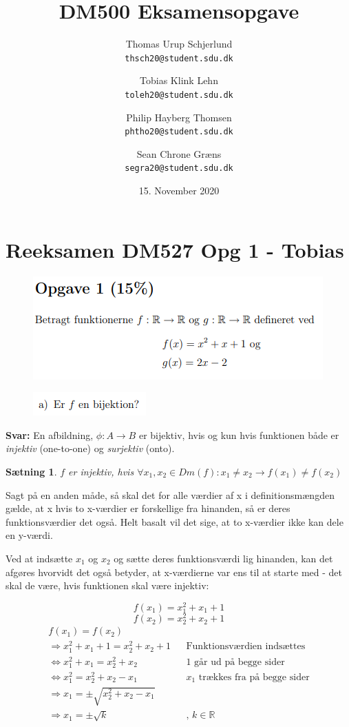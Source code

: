 \documentclass{article}
\title{DM500 Eksamensopgave}
\author{
	Thomas Urup Schjerlund\\
	\texttt{thsch20@student.sdu.dk}
	\and
	Tobias Klink Lehn\\
	\texttt{toleh20@student.sdu.dk}
	\and
	Philip Hayberg Thomsen\\
	\texttt{phtho20@student.sdu.dk}
	\and
	Sean Chrone Græns\\
	\texttt{segra20@student.sdu.dk}
}
\date{15. November 2020}
\newtheorem{theorem}{Sætning}
\begin{document}
\begin{titlepage}
\maketitle
\end{titlepage}

\section{Reeksamen DM527 Opg 1 - Tobias}
\begin{figure}[h]
\includegraphics[scale=1]{Opgave1Formulering}
\end{figure}

\begin{figure}[h]
\includegraphics[scale=1]{opga}
\end{figure}
\textbf{Svar:}
En afbildning, $\phi: A \rightarrow B$ er bijektiv, hvis og kun hvis funktionen både er \emph{injektiv} (one-to-one) og \emph{surjektiv} (onto).

\begin{theorem}
$f$ er injektiv, hvis $\forall x_1, x_2 \in Dm(f): x_1 \neq x_2 \rightarrow f(x_1) \neq f(x_2)$
\end{theorem}

Sagt på en anden måde, så skal det for alle værdier af x i definitionsmængden gælde, at x hvis to x-værdier er forskellige fra hinanden, så er deres funktionsværdier det også. Helt basalt vil det sige, at to x-værdier ikke kan dele en y-værdi.

Ved at indsætte $x_1$ og $x_2$ og sætte deres funktionsværdi lig hinanden, kan det afgøres hvorvidt det også betyder, at x-værdierne var ens til at starte med - det skal de være, hvis funktionen skal være injektiv:
\begin{center}
\[f(x_1) = x_1^2 + x_1 + 1 \] 
\[ f(x_2)=x_2^2 + x_2 + 1 \] 
\begin{align*}
f(x_1) = f(x_2) \\
\Rightarrow x^2_1 + x_1 + 1 = x^2_2 + x_2 + 1 && \text{Funktionsværdien indsættes} \\
\Leftrightarrow x^2_1 + x_1 = x^2_2 + x_2 && \text{1 går ud på begge sider} \\
\Leftrightarrow x_1^2 = x_2^2 + x_2 - x_1 && \text{$x_1$ trækkes fra på begge sider}\\
\Rightarrow x_1 = \pm\sqrt{x_2^2 + x_2 - x_1} \\
\Rightarrow x_1 = \pm\sqrt{k}  && \text{, $k \in \mathbb{R}$}
\end{align*}
\end{center}
\end{document}
